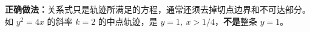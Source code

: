 \begin{trapbox}
\begin{description}[style=nextline,leftmargin=2.8em,labelsep=0.5em,itemsep=0.45em]
\end{description}
\tcbbreak
\begin{center}\end{center}
\begin{description}[style=nextline,leftmargin=2.8em,labelsep=0.5em,itemsep=0.45em]
\item[\textbf{\textcolor{CTrap}{陷阱六：把“中点轨迹方程”当作完整轨迹}}]
\textbf{正确做法：}关系式只是轨迹所满足的方程，通常还须去掉切点边界和不可达部分。
如 $y^2=4x$ 的斜率 $k=2$ 的中点轨迹，是 $y=1,\ x>1/4$，\textbf{不是}整条 $y=1$。
\end{description}
\end{trapbox}
\clearpage
